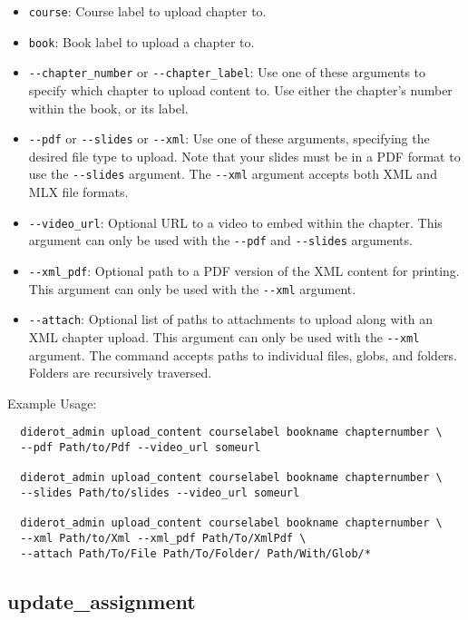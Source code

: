 \begin{itemize}
  \item \verb|course|: Course label to upload chapter to.
  \item \verb|book|: Book label to upload a chapter to.

  \item \verb|--chapter_number| or \verb|--chapter_label|: Use one of these arguments to specify which chapter to upload content to. Use either the chapter's number within the book, or its label.

  \item \verb|--pdf| or \verb|--slides| or \verb|--xml|: Use one of these arguments, specifying the desired file type to upload. Note that your slides must be in a PDF format to use the \verb|--slides| argument. The \verb|--xml| argument accepts both XML and MLX file formats.

  \item \verb|--video_url|: Optional URL to a video to embed within the chapter. This argument can only be used with the \verb|--pdf| and \verb|--slides| arguments.

  \item \verb|--xml_pdf|: Optional path to a PDF version of the XML content for printing. This argument can only be used with the \verb|--xml| argument.

  \item \verb|--attach|: Optional list of paths to attachments to upload along with an XML chapter upload. This argument can only be used with the \verb|--xml| argument. The command accepts paths to individual files, globs, and folders. Folders are recursively traversed.
\end{itemize}

Example Usage:
\begin{verbatim}
  diderot_admin upload_content courselabel bookname chapternumber \
  --pdf Path/to/Pdf --video_url someurl

  diderot_admin upload_content courselabel bookname chapternumber \
  --slides Path/to/slides --video_url someurl

  diderot_admin upload_content courselabel bookname chapternumber \
  --xml Path/to/Xml --xml_pdf Path/To/XmlPdf \
  --attach Path/To/File Path/To/Folder/ Path/With/Glob/*
\end{verbatim}

\subsection{update\_assignment}

